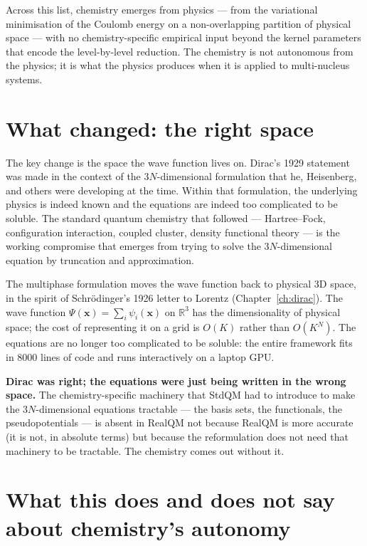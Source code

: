 Across this list, chemistry emerges from physics --- from the variational minimisation of the Coulomb energy on a non-overlapping partition of physical space --- with no chemistry-specific empirical input beyond the kernel parameters that encode the level-by-level reduction. The chemistry is not autonomous from the physics; it is what the physics produces when it is applied to multi-nucleus systems.

\section{What changed: the right space}\label{sec:right-space}

The key change is the space the wave function lives on. Dirac's 1929 statement was made in the context of the $3N$-dimensional formulation that he, Heisenberg, and others were developing at the time. Within that formulation, the underlying physics is indeed known and the equations are indeed too complicated to be soluble. The standard quantum chemistry that followed --- Hartree--Fock, configuration interaction, coupled cluster, density functional theory --- is the working compromise that emerges from trying to solve the $3N$-dimensional equation by truncation and approximation.

The multiphase formulation moves the wave function back to physical 3D space, in the spirit of Schr\"odinger's 1926 letter to Lorentz (Chapter~\ref{ch:dirac}). The wave function $\Psi(\mathbf{x}) = \sum_i \psi_i(\mathbf{x})$ on $\mathbb{R}^3$ has the dimensionality of physical space; the cost of representing it on a grid is $O(K)$ rather than $O(K^N)$. The equations are no longer too complicated to be soluble: the entire framework fits in 8000 lines of code and runs interactively on a laptop GPU.

\textbf{Dirac was right; the equations were just being written in the wrong space.} The chemistry-specific machinery that StdQM had to introduce to make the $3N$-dimensional equations tractable --- the basis sets, the functionals, the pseudopotentials --- is absent in RealQM not because RealQM is more accurate (it is not, in absolute terms) but because the reformulation does not need that machinery to be tractable. The chemistry comes out without it.

\section{What this does and does not say about chemistry's autonomy}\label{sec:autonomy}

